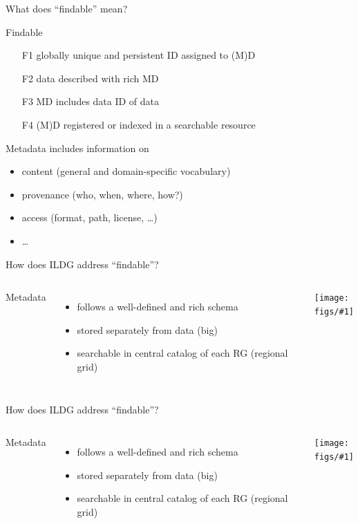 \documentclass[aspectratio=169,xcolor=dvipsnames]{beamer}
\def\figs{figs2}
\begin{document}
\begin{frame}{What does ``findable'' mean?}
  \begin{alertblock}{Findable}
    \begin{itemize}
      \item[F1] globally unique and persistent ID assigned to (M)D
      \item[F2] data described with rich MD %
      \item[F3] MD includes data ID of data
      \item[F4] (M)D registered or indexed in a searchable resource
    \end{itemize}
  \end{alertblock}

  Metadata includes information on
  \begin{itemize}
  \item content (general and domain-specific vocabulary)
  \item provenance (who, when, where, how?)
  \item access (format, path, license, \ldots)
  \item \ldots
  \end{itemize}

\end{frame}
\newcommand{\access}[1]{
\begin{frame}{How does ILDG address ``findable''?}
  \begin{columns}[c] 
    \column{0.5\textwidth}
    Metadata
    \begin{itemize}
    \item follows a well-defined and rich schema
    \item stored \alert{separately} from data (big)
    \item searchable in central catalog of \alert{each} RG (regional grid)
    \end{itemize}
    
    \column{0.5\textwidth}
    \hspace*{-3mm}
    \texttt{[image: \\figs/\#1]}
  \end{columns}
\end{frame}
}
\access{ildg-access1schema}
\access{ildg-access2}
\end{document}
